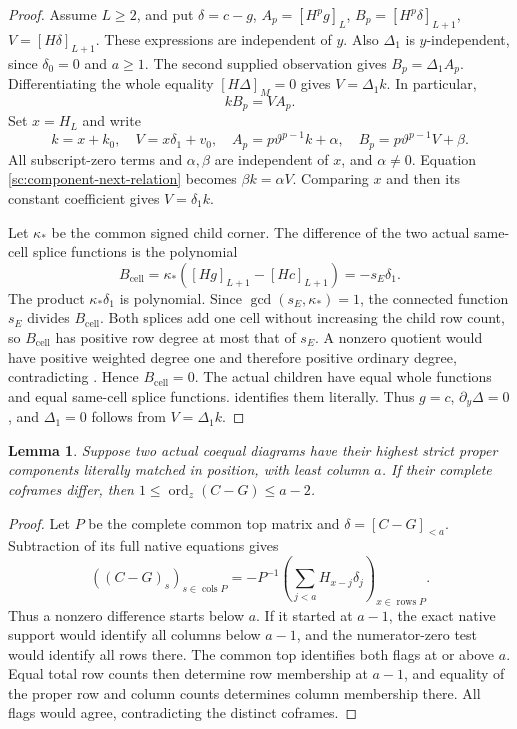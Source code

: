 \documentclass[11pt,a4paper]{amsart}
\numberwithin{equation}{section}
\theoremstyle{plain}
\newtheorem{lemma}[theorem]{Lemma}
\theoremstyle{definition}
\newcommand{\ord}{\operatorname{ord}}
\begin{document}
\begin{proof}
Assume \(L\ge2\), and put \(\delta=c-g\),
\(A_p=[H^pg]_L\), \(B_p=[H^p\delta]_{L+1}\),
\(V=[H\delta]_{L+1}\).  These expressions are independent of \(y\).
Also \(\Delta_1\) is \(y\)-independent, since \(\delta_0=0\) and \(a\ge1\).
The second supplied observation gives
\(B_p=\Delta_1A_p\).  Differentiating the whole equality
\([H\Delta]_M=0\) gives \(V=\Delta_1k\).  In particular,
\begin{equation}\label{sc:component-next-relation}
 kB_p=VA_p.
\end{equation}
Set \(x=H_L\) and write
\[
 k=x+k_0,\quad V=x\delta_1+v_0,\quad
 A_p=p\vartheta^{p-1}k+\alpha,\quad
 B_p=p\vartheta^{p-1}V+\beta.
\]
All subscript-zero terms and \(\alpha,\beta\) are independent of \(x\),
and \(\alpha\ne0\).  Equation \eqref{sc:component-next-relation}
becomes \(\beta k=\alpha V\).  Comparing \(x\) and then its constant
coefficient gives \(V=\delta_1k\).

Let \(\kappa_*\) be the common signed child corner.  The difference
of the two actual same-cell splice functions is the polynomial
\[
 B_{\mathrm{cell}}
 =\kappa_*([Hg]_{L+1}-[Hc]_{L+1})=-s_E\delta_1.
\]
The product \(\kappa_*\delta_1\) is polynomial.  Since
\(\gcd(s_E,\kappa_*)=1\), the connected function \(s_E\) divides
\(B_{\mathrm{cell}}\).  Both splices add one cell without increasing
the child row count, so \(B_{\mathrm{cell}}\) has positive row degree
at most that of \(s_E\).  A nonzero quotient would have positive
weighted degree one and therefore positive ordinary degree,
contradicting .  Hence \(B_{\mathrm{cell}}=0\).
The actual children have equal whole functions and equal same-cell
splice functions.   identifies them literally.
Thus \(g=c\), \(\partial_y\Delta=0\), and \(\Delta_1=0\) follows from
\(V=\Delta_1k\).
\end{proof}

\begin{lemma}\label{sc:top-support}
Suppose two actual coequal diagrams have their highest strict proper
components literally matched in position, with least column \(a\).
If their complete coframes differ, then
\(1\le\ord_z(C-G)\le a-2\).
\end{lemma}
\begin{proof}
Let \(P\) be the complete common top matrix and
\(\delta=[C-G]_{<a}\).  Subtraction of its full native equations gives
\[
 ((C-G)_s)_{s\in\operatorname{cols}P}
   =-P^{-1}\left(\sum_{j<a}H_{x-j}\delta_j\right)_{
                         x\in\operatorname{rows}P}.
\]
Thus a nonzero difference starts below \(a\).  If it started at
\(a-1\), the exact native support would identify all columns below
\(a-1\), and the numerator-zero test would identify all rows there.
The common top identifies both flags at or above \(a\).  Equal total
row counts then determine row membership at \(a-1\), and equality of
the proper row and column counts determines column membership there.
All flags would agree, contradicting the distinct coframes.
\end{proof}
\end{document}
